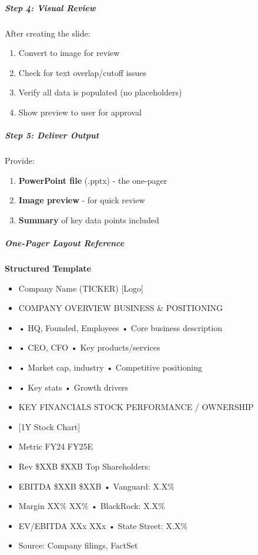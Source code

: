 \documentclass[11pt]{article}
\begin{document}
\subparagraph{Step 4: Visual Review}\mbox{}\par

After creating the slide:

\begin{enumerate}[leftmargin=*,itemsep=2pt,topsep=2pt]
\item {} Convert to image for review
\item {} Check for text overlap/cutoff issues
\item {} Verify all data is populated (no placeholders)
\item {} Show preview to user for approval
\end{enumerate}

\subparagraph{Step 5: Deliver Output}\mbox{}\par

Provide:

\begin{enumerate}[leftmargin=*,itemsep=2pt,topsep=2pt]
\item {} \textbf{PowerPoint file} (.pptx) - the one-pager
\item {} \textbf{Image preview} - for quick review
\item {} \textbf{Summary} of key data points included
\end{enumerate}

\subparagraph{One-Pager Layout Reference}\mbox{}\par

\textbf{Structured Template}
\begin{itemize}[leftmargin=*,itemsep=2pt,topsep=2pt]
\item {} Company Name (TICKER) [Logo]
\item {} COMPANY OVERVIEW BUSINESS \& POSITIONING
\item {} • HQ, Founded, Employees • Core business description
\item {} • CEO, CFO • Key products/services
\item {} • Market cap, industry • Competitive positioning
\item {} • Key stats • Growth drivers
\item {} KEY FINANCIALS STOCK PERFORMANCE / OWNERSHIP
\item {} [1Y Stock Chart]
\item {} Metric FY24 FY25E
\item {} Rev \$XXB \$XXB Top Shareholders:
\item {} EBITDA \$XXB \$XXB • Vanguard: X.X\%
\item {} Margin XX\% XX\% • BlackRock: X.X\%
\item {} EV/EBITDA XXx XXx • State Street: X.X\%
\item {} Source: Company filings, FactSet
\end{itemize}
\end{document}
